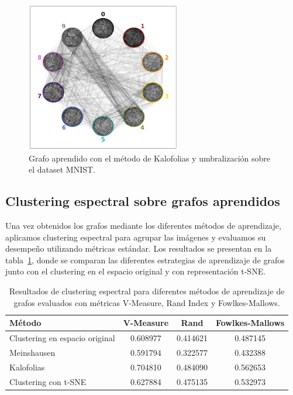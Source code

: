 \documentclass{article}
\begin{document}
\begin{figure}[htb]
    \centering
    \includegraphics[width=0.6\textwidth]{imagenes/mnist/grafo_kalofolias_mnist.png}
    \caption{Grafo aprendido con el método de Kalofolias y umbralización sobre el dataset MNIST.}
    \label{fig:mnist_kalofolias}
\end{figure}

\subsection{Clustering espectral sobre grafos aprendidos}

Una vez obtenidos los grafos mediante los diferentes métodos de aprendizaje, aplicamos clustering espectral para agrupar las imágenes y evaluamos su desempeño utilizando métricas estándar. Los resultados se presentan en la tabla~\ref{tab:clustering_results}, donde se comparan las diferentes estrategias de aprendizaje de grafos junto con el clustering en el espacio original y con representación t-SNE.

\begin{table}[htb]
\centering
\begin{tabular}{lccc}
\hline
\textbf{Método} & \textbf{V-Measure} & \textbf{Rand} & \textbf{Fowlkes-Mallows} \\
\hline
Clustering en espacio original & 0.608977 & 0.414621 & 0.487145 \\
Meinshausen & 0.591794 & 0.322577 & 0.432388 \\
Kalofolias & 0.704810 & 0.484090 & 0.562653 \\
Clustering con t-SNE & 0.627884 & 0.475135 & 0.532973 \\
\hline
\end{tabular}
\caption{Resultados de clustering espectral para diferentes métodos de aprendizaje de grafos evaluados con métricas V-Measure, Rand Index y Fowlkes-Mallows.}
\label{tab:clustering_results}
\end{table}
\end{document}
